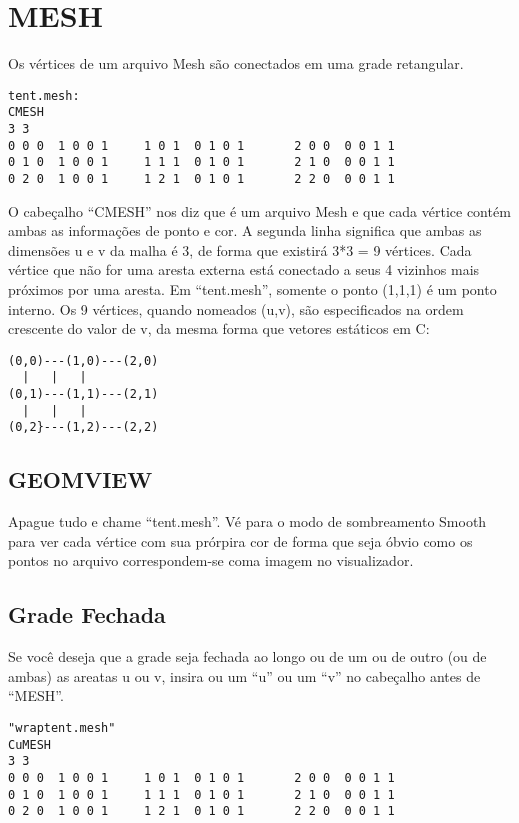 \documentclass[12pt,a4paper]{book}
\begin{document}
\chapter{MESH}

Os vértices de um arquivo Mesh são conectados em uma grade retangular.

\begin{verbatim}
tent.mesh:
CMESH
3 3
0 0 0  1 0 0 1	   1 0 1  0 1 0 1	    2 0 0  0 0 1 1
0 1 0  1 0 0 1	   1 1 1  0 1 0 1	    2 1 0  0 0 1 1
0 2 0  1 0 0 1	   1 2 1  0 1 0 1	    2 2 0  0 0 1 1
\end{verbatim}

O cabeçalho ``CMESH'' nos diz que é um arquivo Mesh e que cada vértice
contém ambas as informações de ponto e cor.  A segunda linha significa que
ambas as dimensões u e v da malha é 3, de forma que existirá 3*3 =
9 vértices. Cada vértice que não for uma aresta externa está conectado a
seus 4 vizinhos mais próximos por uma aresta. Em ``tent.mesh'', somente o
ponto (1,1,1) é um ponto interno. Os 9 vértices, quando nomeados (u,v),
são especificados na ordem crescente do valor de v, da mesma forma que vetores estáticos em C:

\begin{verbatim}
(0,0)---(1,0)---(2,0)   
  |	  |	  |
(0,1)---(1,1)---(2,1)
  |	  |	  |
(0,2}---(1,2)---(2,2)
\end{verbatim}

\section{GEOMVIEW}

Apague tudo e chame ``tent.mesh''. Vé para o modo de sombreamento Smooth para
ver cada vértice com sua prórpira cor de forma que seja óbvio como os pontos no
arquivo correspondem-se coma imagem no visualizador.

\section{Grade Fechada}

Se você deseja que a grade seja fechada ao longo ou de um ou de outro (ou de ambas) as areatas
u ou v, insira ou um ``u'' ou um ``v'' no cabeçalho antes de
``MESH''.
\begin{verbatim}
"wraptent.mesh" 
CuMESH
3 3
0 0 0  1 0 0 1	   1 0 1  0 1 0 1	    2 0 0  0 0 1 1
0 1 0  1 0 0 1	   1 1 1  0 1 0 1	    2 1 0  0 0 1 1
0 2 0  1 0 0 1	   1 2 1  0 1 0 1	    2 2 0  0 0 1 1
\end{verbatim}
\end{document}
